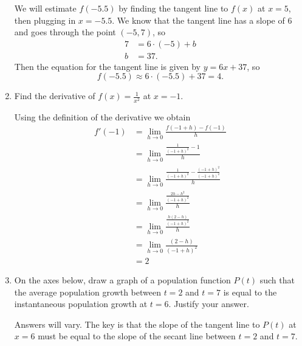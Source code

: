 \documentclass[11pt]{article}
\begin{document}
\begin{enumerate}
{    We will estimate $f(-5.5)$ by finding the tangent line to $f(x)$
    at $x=5$, then plugging in $x=-5.5$. We know that the tangent line
    has a slope of $6$ and goes through the point $(-5,7)$, so
    \begin{align*}
      7 &= 6\cdot (-5) + b\\
      b &= 37.
    \end{align*}
    Then the equation for the tangent line is given by $y = 6x+37$, so
    \[
    f(-5.5)\approx 6\cdot (-5.5) + 37 = 4.
    \]

  }
  \vfill

  \newpage

\item Find the derivative of $f(x) = \frac{1}{x^2}$ at $x=-1$.
  \vfill
  {\color{blue}

    Using the definition of the derivative we obtain
    \begin{align*}
      f'(-1) &= \lim_{h\to 0} \frac{f(-1+h)-f(-1)}{h}\\
      &= \lim_{h\to 0} \frac{\frac{1}{(-1+h)^2}-1}{h}\\
      &= \lim_{h\to 0} \frac{\frac{1}{(-1+h)^2}-\frac{(-1+h)^2}{(-1+h)^2}}{h}\\
      &= \lim_{h\to 0} \frac{\frac{2h-h^2}{(-1+h)^2}}{h}\\
      &= \lim_{h\to 0} \frac{\frac{h(2-h)}{(-1+h)^2}}{h}\\
      &= \lim_{h\to 0} \frac{(2-h)}{(-1+h)^2}\\
      &= 2
    \end{align*}

  }
  \vfill

\item On the axes below, draw a graph of a population function $P(t)$
  such that the average population growth between $t=2$ and $t=7$ is
  equal to the instantaneous population growth at $t=6$.  Justify your
  answer.
  \begin{center}
  \end{center}
  {\color{blue}
    Answers will vary.  The key is that the slope of the tangent line
    to $P(t)$ at $x=6$ must be equal to the slope of the secant line
    between $t=2$ and $t=7$.
  }
\end{enumerate}
\end{document}
